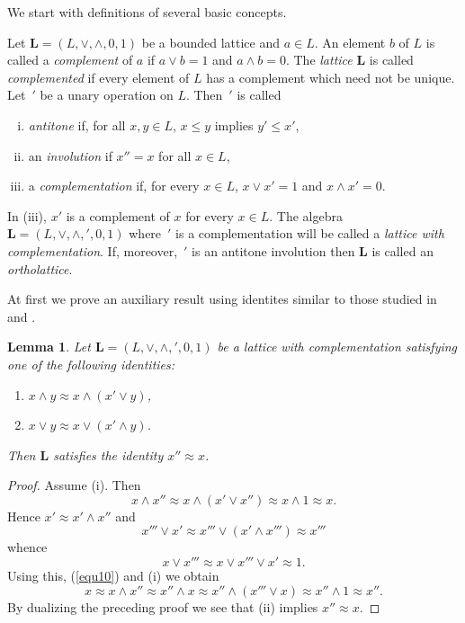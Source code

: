 \documentclass[12pt]{article}
\newtheorem{lemma}[theorem]{Lemma}
\begin{document}
We start with definitions of several basic concepts.

Let $\mathbf L=(L,\vee,\wedge,0,1)$ be a bounded lattice and $a\in L$. An element $b$ of $L$ is called a {\em complement} of $a$ if $a\vee b=1$ and $a\wedge b=0$. The {\em lattice} $\mathbf L$ is called {\em complemented} if every element of $L$ has a complement which need not be unique. Let $\,'$ be a unary operation on $L$. Then $\,'$ is called 
\begin{enumerate}[(i)]
\item {\em antitone} if, for all $x,y\in L$, $x\le y$ implies $y'\le x'$,
\item an {\em involution} if $x''=x$ for all $x\in L$,
\item a {\em complementation} if, for every $x\in L$, $x\vee x'=1$ and $x\wedge x'=0$.
\end{enumerate}
In (iii), $x'$ is a complement of $x$ for every $x\in L$. The algebra $\mathbf L=(L,\vee,\wedge,{}',0,1)$ where $\,'$ is a complementation will be called a {\em lattice with complementation}. If, moreover, $\,'$ is an antitone involution then $\mathbf L$ is called an {\em ortholattice}.

At first we prove an auxiliary result using identites similar to those studied in \cite{CLP} and \cite{CP}.

\begin{lemma}\label{lem2}
Let $\mathbf L=(L,\vee,\wedge,{}',0,1)$ be a lattice with complementation satisfying one of the following identities:
\begin{enumerate}[{\rm(i)}]
\item $x\wedge y\approx x\wedge(x'\vee y)$,
\item $x\vee y\approx x\vee(x'\wedge y)$.
\end{enumerate}
Then $\mathbf L$ satisfies the identity $x''\approx x$.	
\end{lemma}

\begin{proof}
Assume (i). Then
\begin{equation}\label{equ10}
x\wedge x''\approx x\wedge(x'\vee x'')\approx x\wedge1\approx x.
\end{equation}
Hence $x'\approx x'\wedge x''$ and
\[
x'''\vee x'\approx x'''\vee(x'\wedge x''')\approx x'''
\]
whence
\[
x\vee x'''\approx x\vee x'''\vee x'\approx1.
\]
Using this, (\ref{equ10}) and (i) we obtain
\[
x\approx x\wedge x''\approx x''\wedge x\approx x''\wedge(x'''\vee x)\approx x''\wedge1\approx x''.
\]
By dualizing the preceding proof we see that (ii) implies $x''\approx x$.		
\end{proof}
\end{document}
